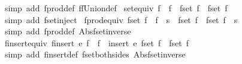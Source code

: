 \begin{isabellebody}
\endisadelimproof
%
\isatagproof
{}\isamarkupfalse%
\ {\isacharparenleft}simp\ add{\isacharcolon}\ fprod{\isacharunderscore}def\ ffUnion{\isacharunderscore}def{\isacharparenright}%
\endisatagproof
{\isafoldproof}%
%
\isadelimproof
\isanewline
%
\endisadelimproof
\isanewline
{}\isamarkupfalse%
\ set{\isacharunderscore}equiv{\isacharcolon}\ {\isachardoublequoteopen}{\isacharparenleft}f{}\ {\isacharequal}\ f{}{\isacharparenright}\ {\isacharequal}\ {\isacharparenleft}fset\ f{}\ {\isacharequal}\ fset\ f{}{\isacharparenright}{\isachardoublequoteclose}\isanewline
%
\isadelimproof
\ \ %
\endisadelimproof
%
\isatagproof
{}\isamarkupfalse%
\ {\isacharparenleft}simp\ add{\isacharcolon}\ fset{\isacharunderscore}inject{\isacharparenright}%
\endisatagproof
{\isafoldproof}%
%
\isadelimproof
\isanewline
%
\endisadelimproof
\isanewline
{}\isamarkupfalse%
\ fprod{\isacharunderscore}equiv{\isacharcolon}\ {\isachardoublequoteopen}{\isacharparenleft}fset\ {\isacharparenleft}f\ {\isacharbar}{\isasymtimes}{\isacharbar}\ f{\isacharprime}{\isacharparenright}\ {\isacharequal}\ s{\isacharparenright}\ {\isacharequal}\ {\isacharparenleft}{\isacharparenleft}{\isacharparenleft}fset\ f{\isacharparenright}\ {\isasymtimes}\ {\isacharparenleft}fset\ f{\isacharprime}{\isacharparenright}{\isacharparenright}\ {\isacharequal}\ s{\isacharparenright}{\isachardoublequoteclose}\isanewline
%
\isadelimproof
\ \ %
\endisadelimproof
%
\isatagproof
{}\isamarkupfalse%
\ {\isacharparenleft}simp\ add{\isacharcolon}\ fprod{\isacharunderscore}def\ Abs{\isacharunderscore}fset{\isacharunderscore}inverse{\isacharparenright}%
\endisatagproof
{\isafoldproof}%
%
\isadelimproof
\isanewline
%
\endisadelimproof
\isanewline
{}\isamarkupfalse%
\ finsert{\isacharunderscore}equiv{\isacharcolon}\ {\isachardoublequoteopen}{\isacharparenleft}finsert\ e\ f\ {\isacharequal}\ f{\isacharprime}{\isacharparenright}\ {\isacharequal}\ {\isacharparenleft}insert\ e\ {\isacharparenleft}fset\ f{\isacharparenright}\ {\isacharequal}\ {\isacharparenleft}fset\ f{\isacharprime}{\isacharparenright}{\isacharparenright}{\isachardoublequoteclose}\isanewline
%
\isadelimproof
\ \ %
\endisadelimproof
%
\isatagproof
{}\isamarkupfalse%
\ {\isacharparenleft}simp\ add{\isacharcolon}\ finsert{\isacharunderscore}def\ fset{\isacharunderscore}both{\isacharunderscore}sides\ Abs{\isacharunderscore}fset{\isacharunderscore}inverse{\isacharparenright}%
\endisatagproof
{\isafoldproof}%
%
\isadelimproof
\isanewline

\end{isabellebody}
